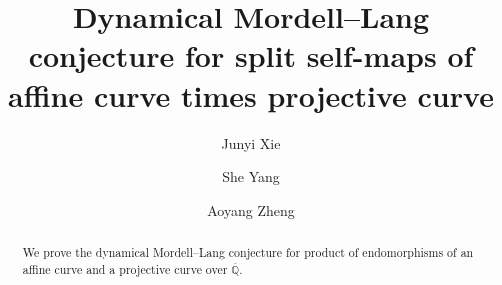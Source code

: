 \documentclass[12pt]{amsart}
\begin{document}
\begin{spacing}{1.25}

\newtheorem{theorem}{Theorem}[section]
\newtheorem{lemma}[theorem]{Lemma}
\newtheorem{proposition}[theorem]{Proposition}
\newtheorem{corollary}[theorem]{Corollary}
\newtheorem{conjecture}[theorem]{Conjecture}
\newtheorem{conv}[theorem]{Convention}
\newtheorem{ques}[theorem]{Question} 
\newtheorem{prb}[theorem]{Problem}

\newtheorem*{DML}{Dynamical Mordell--Lang Conjecture (DML Conjecture)}

	
	\theoremstyle{definition}
	\newtheorem{definition}[theorem]{Definition}
	\newtheorem{example}[theorem]{Example}
	
	\theoremstyle{remark}
	\newtheorem{remark}[theorem]{Remark}
	
	


    
	\title{Dynamical Mordell--Lang conjecture for split self-maps of affine curve times projective curve}
	\author{Junyi Xie}
	\address{Beijing International Center for Mathematical Research \\ Peking University \\ Beijing 100871 \\ China}
	\author{She Yang}
	\address{Beijing International Center for Mathematical Research \\ Peking University \\ Beijing 100871 \\ China}
	\author{Aoyang Zheng}
	\address{Beijing International Center for Mathematical Research \\ Peking University \\ Beijing 100871 \\ China}


	
	\begin{abstract}
We prove the dynamical Mordell--Lang conjecture for product of endomorphisms of an affine curve and a projective curve over $\overline{\mathbb{Q}}$.
	\end{abstract}


	
	\maketitle
	\setcounter{tocdepth}{1}
	

\end{spacing}
\end{document}
